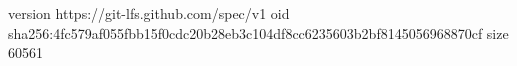 version https://git-lfs.github.com/spec/v1
oid sha256:4fc579af055fbb15f0cdc20b28eb3c104df8cc6235603b2bf8145056968870cf
size 60561
